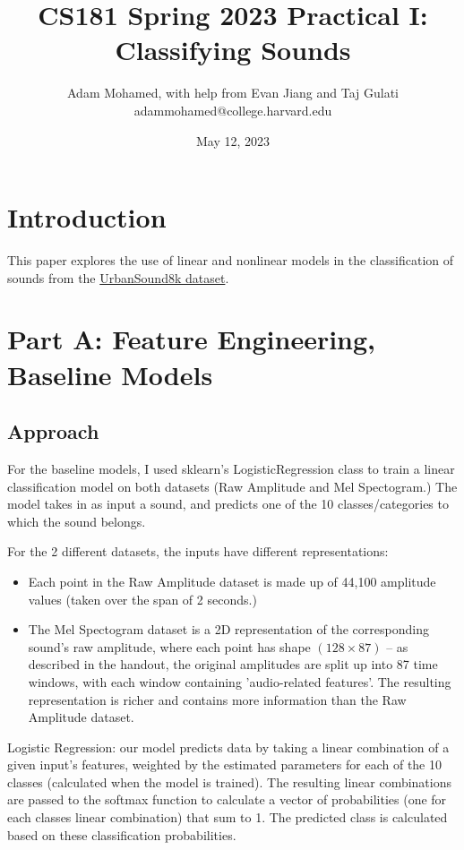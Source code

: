 \documentclass[11pt]{article}
\title{CS181 Spring 2023 Practical I: Classifying Sounds}
\author{Adam Mohamed, with help from Evan Jiang and Taj Gulati \heart \\ adammohamed@college.harvard.edu}
\date{May 12, 2023}
\begin{document}
\maketitle{}


\section{Introduction}
This paper explores the use of linear and nonlinear models in the classification of sounds from the \href{https://urbansounddataset.weebly.com/urbansound8k.html}{UrbanSound8k dataset}.

\section{Part A: Feature Engineering, Baseline Models}

\subsection{Approach}

For the baseline models, I used sklearn's LogisticRegression class to train a linear classification model on both datasets (Raw Amplitude and Mel Spectogram.) The model takes in as input a sound, and predicts one of the 10 classes/categories to which the sound belongs. 

For the 2 different datasets, the inputs have different representations:

\begin{itemize}
    \item Each point in the Raw Amplitude dataset is made up of 44,100 amplitude values (taken over the span of 2 seconds.)
    \item The Mel Spectogram dataset is a 2D representation of the corresponding sound's raw amplitude, where each point has shape $(128 \times 87)$ -- as described in the handout, the original amplitudes are split up into 87 time windows, with each window containing 'audio-related features'. The resulting representation is richer and contains more information than the Raw Amplitude dataset.
\end{itemize}

\noindent Logistic Regression: our model predicts data by taking a linear combination of a given input's features, weighted by the estimated parameters for each of the 10 classes (calculated when the model is trained). The resulting linear combinations are passed to the softmax function to calculate a vector of probabilities (one for each classes linear combination) that sum to 1. The predicted class is calculated based on these classification probabilities.
\end{document}
